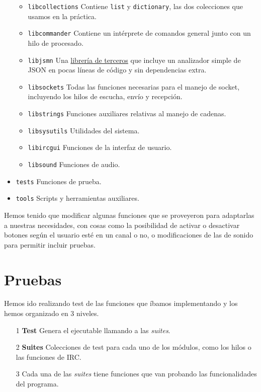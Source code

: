 \documentclass{article}
\begin{document}
\begin{itemize}
\begin{itemize}
\item \texttt{libcollections} Contiene \texttt{list} y \texttt{dictionary}, las dos colecciones que usamos en la práctica.
\item \texttt{libcommander} Contiene un intérprete de comandos general junto con un hilo de procesado.
\item \texttt{libjsmn} Una \href{http://zserge.bitbucket.org/jsmn.html}{librería de terceros} que incluye un analizador simple de JSON en pocas líneas de código y sin dependencias extra.
\item \texttt{libsockets} Todas las funciones necesarias para el manejo de socket, incluyendo los hilos de escucha, envío y recepción.
\item \texttt{libstrings} Funciones auxiliares relativas al manejo de cadenas.
\item \texttt{libsysutils} Utilidades del sistema.
\item \texttt{libircgui} Funciones de la interfaz de usuario.
\item \texttt{libsound} Funciones de audio.
\end{itemize}
\item \texttt{tests} Funciones de prueba.
\item \texttt{tools} Scripts y herramientas auxiliares.
\end{itemize}

Hemos tenido que modificar algunas funciones que se proveyeron para adaptarlas a nuestras necesidades, con cosas como la posibilidad de activar o desactivar botones según el usuario esté en un canal o no, o modificaciones de las de sonido para permitir incluir pruebas.

\section{Pruebas}
Hemos ido realizando test de las funciones que íbamos implementando y los hemos organizado en 3 niveles. 

\begin{itemize}
\item[1] \textbf{Test} Genera el ejecutable llamando a las \textit{suites}.
\item[2] \textbf{Suites} Colecciones de test para cada uno de los módulos, como los hilos o las funciones de IRC.
\item[3] Cada una de las \textit{suites} tiene funciones que van probando las funcionalidades del programa.
\end{itemize}
\end{document}
